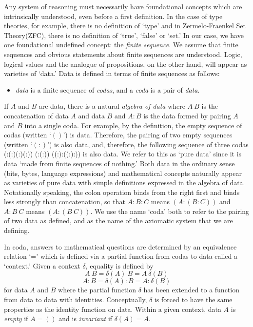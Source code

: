 \documentclass[11pt]{article}
\begin{document}
     Any system of reasoning must necessarily have foundational concepts which are intrinsically understood, even before a first definition.
In the case of type theories\cite{Type,Type2,HOTT,aldor}, for example, there is no definition of `type' and in Zermelo-Fraenkel Set Theory(ZFC\cite{ZFC}), there is no definition of `true', `false' or `set.'
In our case, we have one foundational undefined concept:
the {\it finite sequence}.  We assume that finite sequences and obvious statements about finite sequences are understood.  
Logic, logical values and the analogue of propositions, on the other hand, will appear as varieties of `data.'  Data is defined in terms of finite sequences as follows:
\begin{itemize}
\item {\it data} is a finite sequence of {\it codas}, and a {\it coda} is a pair of {\it data}.
\end{itemize}
If $A$ and $B$ are data, there is a natural {\it algebra of data} where $A\ B$ is the concatenation of data $A$ and data $B$ and $A:B$ is
the data formed by pairing $A$ and $B$ into a single coda.  For example, by the definition, the empty sequence of codas (written `$()$') is data.  Therefore,
the pairing of two empty sequences (written `$(:)$') is also data, and, therefore, the following sequence of three codas (:(:)(:)(:)) (:(:)) ((:):((:):)) is also data.
We refer to this as `pure data' since it is data `made from finite sequences of nothing.'
Both data in the ordinary sense (bits, bytes, language expressions) and mathematical concepts naturally appear as varieties
of pure data with simple definitions expressed in the algebra of data.  Notationally speaking, the colon operation binds from the right first and binds
less strongly than concatenation, so that $A:B:C$ means $(A:(B:C))$ and $A:B\ C$ means $(A:(B\ C))$.  We use the name `coda' both to refer 
to the pairing of two data as defined, and as the name of the axiomatic system that we are defining\cite{github}.

     In coda, answers to mathematical questions are determined by an equivalence relation `=' which is defined via a partial function from codas to data
called a `context.'  Given a context $\delta$, equality is defined by
\begin{equation}
	A\ B = \delta(A)\ B = A\ \delta(B)
\end{equation}
\begin{equation}
	A:B = \delta(A):B = A:\delta(B)
\end{equation}
for data $A$ and $B$ where the partial function $\delta$ has been extended to a function from data to data with identities.
Conceptually, $\delta$ is forced to have the same properties as the identity function on data.  Within a given context,
data $A$ is {\it empty} if $A=()$ and is {\it invariant} if $\delta(A)=A$.
\end{document}
